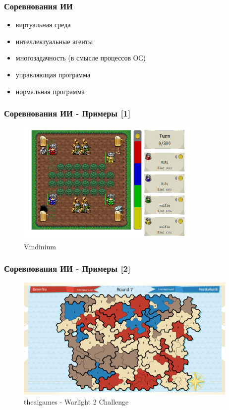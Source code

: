 \documentclass{beamer}
\begin{document}
\begin{frame}
  \frametitle{Соревнования ИИ}
  \begin{itemize}
  \item виртуальная среда
  \item интеллектуальные агенты
  \item многозадачность (в смысле процессов ОС)
  \item управляющая программа
  \item нормальная программа
  \end{itemize}
\end{frame}

\begin{frame}
  \frametitle{Соревнования ИИ - Примеры [1]}
  \begin{figure}[htb]
  \centering
  \includegraphics[height=6cm,keepaspectratio]{./img/vindinium.png}
  \caption{Vindinium}
  \end{figure}
\end{frame}

\begin{frame}
  \frametitle{Соревнования ИИ - Примеры [2]}
  \begin{figure}[htb]
  \centering
  \includegraphics[height=6cm,keepaspectratio]{./img/warlight.png}
  \caption{theaigames - Warlight 2 Challenge}
  \end{figure}
\end{frame}
\end{document}
